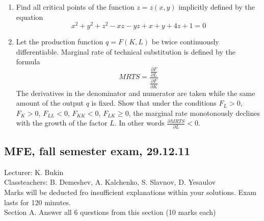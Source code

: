 \documentclass[12pt]{article} %
\theoremstyle{definition} %
\begin{document}
\begin{enumerate}
\item Find all critical points of the function $z=z(x,y)$ implicitly defined by the equation
\begin{equation}
x^2+y^2+z^2-xz-yz+x+y+4z+1=0
\end{equation}

\item Let the production function $q=F(K,L)$ be twice continuously differentiable. Marginal rate of technical substitution is defined by the formula
\begin{equation}
MRTS=\frac{\frac{\partial F}{\partial L}}{\frac{\partial F}{\partial K}}
\end{equation}
The derivatives in the denominator and numerator are taken while the same amount of the output $q$ is fixed.
Show that under the conditions $F_L>0$, $F_K>0$, $F_{LL}<0$, $F_{KK}<0$, $F_{LK}\geq 0$, the marginal rate monotonously declines with the growth of the factor $L$. In other words $\frac{\partial MRTS}{\partial L}<0$.
\end{enumerate}

\subsection{MFE, fall semester exam, 29.12.11}

Lecturer: K. Bukin \\
Classteachers: B. Demeshev, A. Kalchenko, S. Slavnov, D. Yesaulov \\

Marks will be deducted fro insufficient explanations within your solutions. Exam lasts for 120 minutes. \\

Section A. Answer all 6 questions from this section (10 marks each) \\
\end{document}
